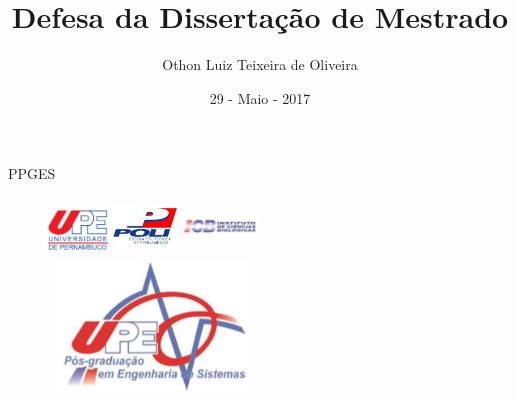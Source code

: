 \documentclass[11pt]{beamer}
\author{ Othon Luiz Teixeira de Oliveira }
\title[PPGES]{Defesa da Dissertação de Mestrado}
\institute{Escola Politécnica de Pernambuco -- Poli ---  UPE}
\date{29 - Maio - 2017}
\begin{document}
\newcommand{\capa}{
    \begin{tikzpicture}[remember picture,overlay]
        \node at (current page.south west)
            {\begin{tikzpicture}[remember picture, overlay]
                \fill[shading=radial,top color=orange,bottom color=orange,middle color=yellow] (0,0) rectangle (\paperwidth,\paperheight);
            \end{tikzpicture}
          };
    \end{tikzpicture}
}


\begin{frame}
	\titlepage
\end{frame}

\begin{frame}{PPGES}
\begin{figure}[h]
\includegraphics[width=16mm, height=13mm]{Figuras/Capa/upelogo.eps}
\qquad \quad \quad \quad \quad
\includegraphics[width=17mm, height=15mm]{Figuras/Capa/logoPoli.jpg}
\qquad \quad \quad \quad \quad \quad \quad 	\vspace{0.5in}
\includegraphics[width=20mm, height=15mm]{Figuras/Capa/icblogo.png}
\\
\includegraphics[width=55mm, height=35mm]{Figuras/Capa/logo_ppges3.png}

\end{figure}
\end{frame}
\end{document}
